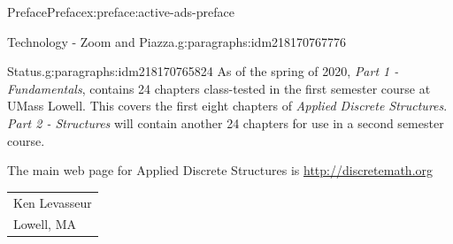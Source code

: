 \documentclass[oneside,10pt,]{book}
\numberwithin{equation}{section}
\begin{document}
\begin{preface}{Preface}{}{Preface}{}{}{x:preface:active-ads-preface}
\begin{paragraphs}{Technology - Zoom and Piazza.}{g:paragraphs:idm218170767776}
\end{paragraphs}%
\begin{paragraphs}{Status.}{g:paragraphs:idm218170765824}%
As of the spring of 2020, \emph{Part 1 - Fundamentals}, contains 24 chapters class-tested in the first semester course at UMass Lowell. This covers the first eight chapters of \emph{Applied Discrete Structures}. \emph{Part 2 - Structures} will contain another 24 chapters for use in a second semester course.%
\end{paragraphs}%
\par
The main web page for Applied Discrete Structures is \url{http://discretemath.org}%
\nopagebreak\par%
\hfill\begin{tabular}[t]{l@{}}
Ken Levasseur\\
Lowell, MA
\end{tabular}\\\par
\end{preface}
\setcounter{tocdepth}{0}
\renewcommand*\contentsname{Contents}
\tableofcontents
\mainmatter
%
%
\typeout{************************************************}
\typeout{************************************************}
%
\end{document}
